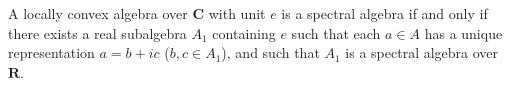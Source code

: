 A locally convex algebra over $\mathbf{C}$ with unit $e$ is a spectral algebra if and only if there exists a real subalgebra $A_1$ containing $e$ such that each $a \in A$ has a unique representation $a = b + ic$ ($b, c \in A_1$), and such that $A_1$ is a spectral algebra over $\mathbf{R}$.
